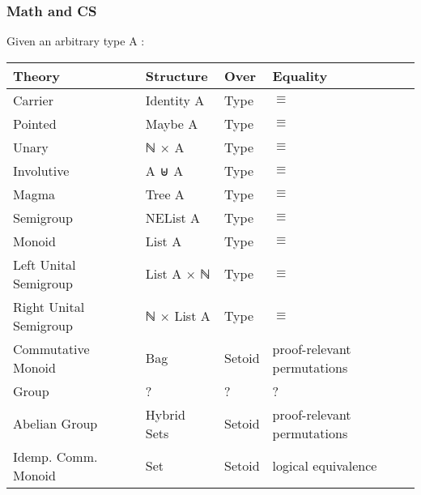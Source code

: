 \documentclass[serif,mathserif,professionalfont,10pt]{beamer}
\begin{document}
\begin{frame}
\frametitle{Math and CS}
Given an arbitrary type A : \\ \vspace*{4mm}
\begin{tabular}{llll}
\textbf{Theory} & \textbf{Structure} & Over & Equality \\ \hline
Carrier & Identity A & Type  & $\equiv$ \\
Pointed & Maybe A & Type & $\equiv$\\ \hline
Unary & ℕ × A &  Type & $\equiv$\\
Involutive & A ⊎ A & Type & $\equiv$ \\ \hline
Magma & Tree A &  Type & $\equiv$\\
Semigroup & NEList A & Type & $\equiv$\\ \hline
Monoid & List A & Type & $\equiv$\\
Left Unital Semigroup & List A × ℕ & Type & $\equiv$\\
Right Unital Semigroup & ℕ × List A & Type & $\equiv$\\ \hline
Commutative Monoid & Bag & Setoid &  proof-relevant permutations \\
Group & ? & ? & ? \\
Abelian Group & Hybrid Sets & Setoid &  proof-relevant permutations\\
Idemp. Comm. Monoid & Set & Setoid &  logical equivalence \\
\end{tabular}
\end{frame}
\end{document}

